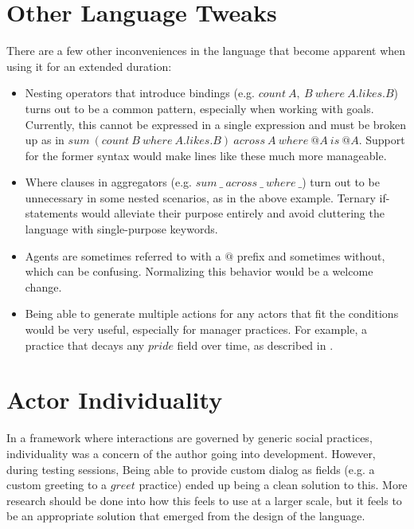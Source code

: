 \section{Other Language Tweaks} \label{sec:OtherLanguageTweaks}

There are a few other inconveniences in the language that become apparent when using it
for an extended duration:

\begin{itemize}
    \item Nesting operators that introduce bindings (e.g. $count\ A,\ B\ where\ A.likes.B$)
    turns out to be a common pattern, especially when working with goals. Currently,
    this cannot be expressed in a single expression and must be broken up as in
    $sum\ (count\ B\ where\ A.likes.B)\ across\ A\ where\ @A\ is\ @A$. Support for the
    former syntax would make lines like these much more manageable.
    \item Where clauses in aggregators (e.g. $sum\ \_\ across\ \_\ where\ \_$) turn out
    to be unnecessary in some nested scenarios, as in the above example. Ternary
    if-statements would alleviate their purpose entirely and avoid cluttering
    the language with single-purpose keywords.
    \item Agents are sometimes referred to with a $@$ prefix and sometimes without, which
    can be confusing. Normalizing this behavior would be a welcome change.
    \item Being able to generate multiple actions for any actors that fit the conditions
    would be very useful, especially for manager practices. For example, a practice that
    decays any $pride$ field over time, as described in .
\end{itemize}

\section{Actor Individuality} \label{sec:ActorIndividuality}

In a framework where interactions are governed by generic social practices, individuality
was a concern of the author going into development. However, during testing sessions,
Being able to provide custom dialog as fields (e.g. a custom greeting to a $greet$
practice) ended up being a clean solution to this. More research should be done into
how this feels to use at a larger scale, but it feels to be an appropriate solution
that emerged from the design of the language.

